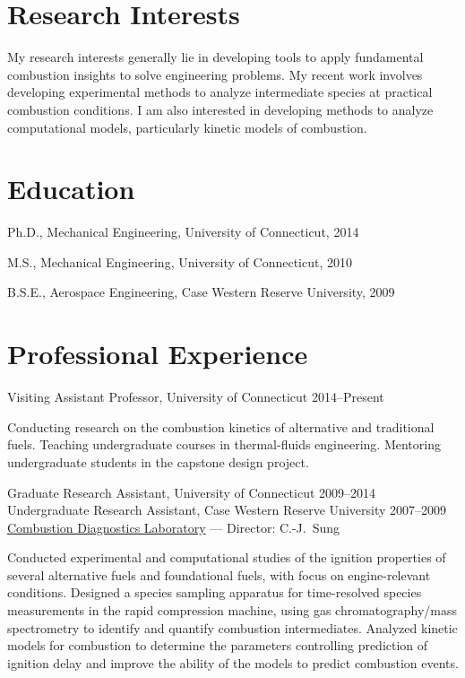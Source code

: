 \section{{\sectionfont Research Interests}}

My research interests generally lie in developing tools to apply fundamental
combustion insights to solve engineering problems. My recent work
involves developing experimental methods to analyze intermediate species
at practical combustion conditions. I am also interested in developing
methods to analyze computational models, particularly kinetic models of
combustion.

\section{{\sectionfont Education}}

Ph.D., Mechanical Engineering, University of Connecticut, 2014

M.S., Mechanical Engineering, University of Connecticut, 2010

B.S.E., Aerospace Engineering, Case Western Reserve University, 2009

\section{{\sectionfont Professional Experience}}

Visiting Assistant Professor, University of Connecticut \hfill 2014--Present

Conducting research on the combustion kinetics of alternative and traditional
fuels. Teaching undergraduate courses in thermal-fluids engineering. Mentoring
undergraduate students in the capstone design project.

\vspace{\baselineskip}

Graduate Research Assistant, University of Connecticut \hfill 2009--2014\\
Undergraduate Research Assistant, Case Western Reserve University \hfill 2007--2009\\
\href{http://combdiaglab.engr.uconn.edu}{Combustion Diagnostics Laboratory} --- Director: C.-J.\ Sung

Conducted experimental and computational studies of the ignition
properties of several alternative fuels and foundational fuels, with
focus on engine-relevant conditions.
Designed a species sampling apparatus for time-resolved
species measurements in the rapid compression machine, using gas
chromatography/mass spectrometry to identify and quantify
combustion intermediates.
Analyzed kinetic models for combustion to determine the parameters
controlling prediction of ignition delay and improve the ability of
the models to predict combustion events.

